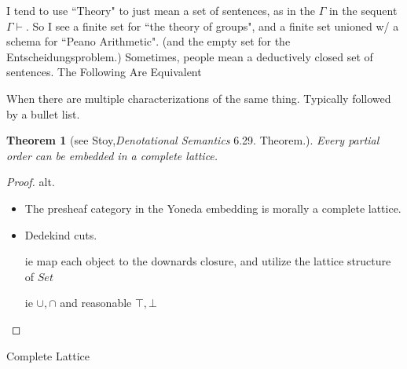 \documentclass[
	fontsize=10pt, %
	twoside=false, %
	secnumdepth=-1, %
]{kaobook}
\theoremstyle{break}
\newtheorem*{thm}{Theorem} %
\begin{document}
    I tend to use ``Theory" to just mean a set of sentences,
    as in the $Γ$ in the sequent $Γ ⊢ $.
    So I see a finite set for ``the theory of groups",
    and a finite set unioned w/ a schema for ``Peano Arithmetic".
    (and the empty set for the Entscheidungsproblem.)
    Sometimes, people mean a deductively closed set of sentences.
    The Following Are Equivalent

    When there are multiple characterizations of the same thing.
    Typically followed by a bullet list.
    \begin{thm}[see Stoy,\textit{Denotational Semantics} 6.29. Theorem.]
        Every partial order can be embedded in a complete lattice.
    \end{thm}
    \begin{proof}
        alt.
        \begin{itemize}
            \item The presheaf category in the Yoneda embedding is morally a complete lattice.
            \item Dedekind cuts.
                
            ie map each object to the downards closure,
            and utilize the lattice structure of $Set$

            ie $∪,∩$ and reasonable $⊤,⊥$
        \end{itemize}
    \end{proof}

    \See Complete Lattice
%
%
%
%
%
\end{document}
